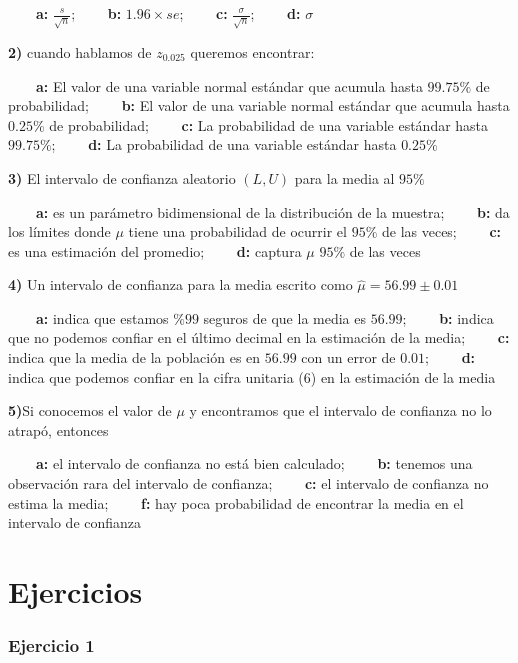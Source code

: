 \documentclass[
]{book}
\begin{document}
\textbf{\(\qquad\)a:} \(\frac{s}{\sqrt{n}}\);
\textbf{\(\qquad\)b:} \(1.96\times se\);
\textbf{\(\qquad\)c:} \(\frac{\sigma}{\sqrt{n}}\);
\textbf{\(\qquad\)d:} \(\sigma\)

\textbf{2)} cuando hablamos de \(z_{0.025}\) queremos encontrar:

\textbf{\(\qquad\)a:} El valor de una variable normal estándar que acumula hasta \(99.75\%\) de probabilidad;
\textbf{\(\qquad\)b:} El valor de una variable normal estándar que acumula hasta \(0.25\%\) de probabilidad;
\textbf{\(\qquad\)c:} La probabilidad de una variable estándar hasta \(99.75\%\);
\textbf{\(\qquad\)d:} La probabilidad de una variable estándar hasta \(0.25\%\)

\textbf{3)} El intervalo de confianza aleatorio \((L,U)\) para la media al \(95\%\)

\textbf{\(\qquad\)a:} es un parámetro bidimensional de la distribución de la muestra;
\textbf{\(\qquad\)b:} da los límites donde \(\mu\) tiene una probabilidad de ocurrir el \(95\%\) de las veces;
\textbf{\(\qquad\)c:} es una estimación del promedio;
\textbf{\(\qquad\)d:} captura \(\mu\) \(95\%\) de las veces

\textbf{4)} Un intervalo de confianza para la media escrito como \(\hat{\mu}=56.99 \pm 0.01\)

\textbf{\(\qquad\)a:} indica que estamos \(\%99\) seguros de que la media es \(56.99\);
\textbf{\(\qquad\)b:} indica que no podemos confiar en el último decimal en la estimación de la media;
\textbf{\(\qquad\)c:} indica que la media de la población es en \(56.99\) con un error de \(0.01\);
\textbf{\(\qquad\)d:} indica que podemos confiar en la cifra unitaria (\(6\)) en la estimación de la media

\textbf{5)}Si conocemos el valor de \(\mu\) y encontramos que el intervalo de confianza no lo atrapó, entonces

\textbf{\(\qquad\)a:} el intervalo de confianza no está bien calculado;
\textbf{\(\qquad\)b:} tenemos una observación rara del intervalo de confianza;
\textbf{\(\qquad\)c:} el intervalo de confianza no estima la media;
\textbf{\(\qquad\)f:} hay poca probabilidad de encontrar la media en el intervalo de confianza

\hypertarget{ejercicios-11}{%
\section{Ejercicios}\label{ejercicios-11}}

\hypertarget{ejercicio-1-11}{%
\subsubsection{Ejercicio 1}\label{ejercicio-1-11}}
\end{document}
